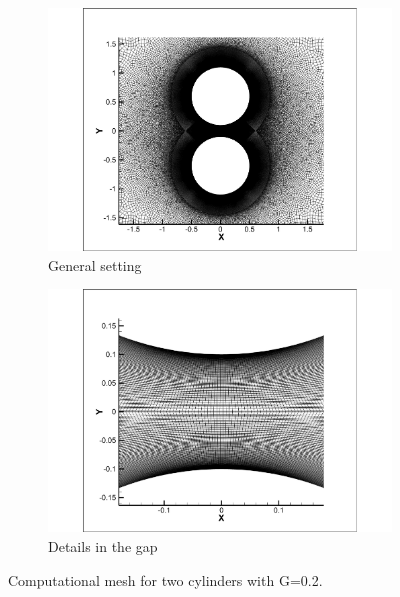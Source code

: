 \begin{figure}[tb]	
	\newcommand\widthp{0.5}
	\centering
	\hspace*{\fill}%
	\begin{subfigure}[t]{\widthp\textwidth}
		\centering
		\includegraphics[width=\linewidth]{Figs/two_cylinders}
		\caption{General setting}
		\label{fig:twocylinders}
	\end{subfigure}%
	\begin{subfigure}[t]{\widthp\textwidth}
		\centering
		\includegraphics[width=\linewidth]{"Figs/two cylinders_gap_zone"}
		\caption{Details in the gap}
		\label{fig:two-cylindersgapzone}
	\end{subfigure}%
	\caption{
		Computational mesh for two cylinders with G=0.2.
	}
	\label{twocylinderssum}
	
\end{figure}

